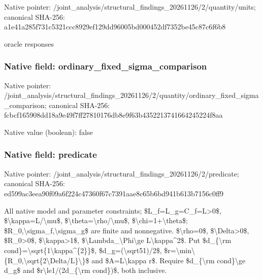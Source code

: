 \documentclass[10pt,a4paper]{article}
\begin{document}
Native pointer: /joint\_analysis/structur\allowbreak{}al\_findings\_20261126/2/q\allowbreak{}uantity/units; canonical SHA-256: a1e41a285f731c5321ccc892\allowbreak{}9ef129dd96005bd000452df7\allowbreak{}352be45c87c6f6b8


oracle responses


\subsubsection{Native field: ordinary\_fixed\_sigma\_comparison}


Native pointer: /joint\_analysis/structur\allowbreak{}al\_findings\_20261126/2/q\allowbreak{}uantity/ordinary\_fixed\_s\allowbreak{}igma\_comparison; canonical SHA-256: fcbcf165908dd18a9e49f7ff\allowbreak{}27810176db8e9f63b4352213\allowbreak{}741664245224f8aa



Native value (boolean): false



\subsubsection{Native field: predicate}


Native pointer: /joint\_analysis/structur\allowbreak{}al\_findings\_20261126/2/p\allowbreak{}redicate; canonical SHA-256: ed599ac3eea90f09a6f224c4\allowbreak{}7360f67c7391aae8c65b6bd9\allowbreak{}41b613b7156c0ff9


All native model and parameter constraints; \$L\_f=L\_g=C\_f=L>0\$, \$\textbackslash{}kappa=L/\textbackslash{}mu\$, \$\textbackslash{}theta=\textbackslash{}rho/\textbackslash{}mu\$, \$\textbackslash{}chi=1+\textbackslash{}theta\$; \$R\_0,\textbackslash{}sigma\_f,\textbackslash{}sigma\_g\$ are finite and nonnegative. \$\textbackslash{}rho=0\$, \$\textbackslash{}Delta>0\$, \$R\_0>0\$, \$\textbackslash{}kappa>1\$, \$\textbackslash{}Lambda\_\textbackslash{}Phi\textbackslash{}ge L\textbackslash{}kappa\textasciicircum{}2\$. Put \$d\_\{\textbackslash{}rm cond\}=\textbackslash{}sqrt\{1\textbackslash{}kappa\textasciicircum{}\{2\}\}\$, \$d\_g=(\textbackslash{}sqrt51)/2\$, \$r=\textbackslash{}min\textbackslash{}\{R\_0,\textbackslash{}sqrt\{2\textbackslash{}Delta/L\}\textbackslash{}\}\$ and \$A=L\textbackslash{}kappa r\$. Require \$d\_\{\textbackslash{}rm cond\}\textbackslash{}ge d\_g\$ and \$r\textbackslash{}le1/(2d\_\{\textbackslash{}rm cond\})\$, both inclusive.
\end{document}
